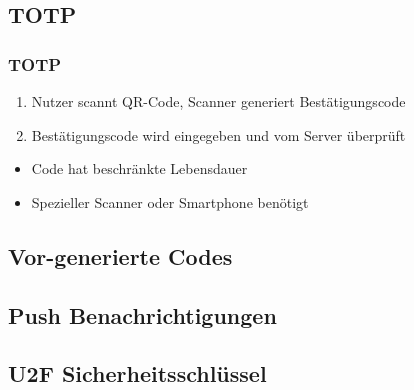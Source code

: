 \subsection{TOTP}
\begin{frame}
    \frametitle{TOTP}
    \begin{enumerate}
        \item Nutzer scannt QR-Code, Scanner generiert Bestätigungscode
        \item Bestätigungscode wird eingegeben und vom Server überprüft
    \end{enumerate}
    \begin{itemize}
        \item Code hat beschränkte Lebensdauer
        \item Spezieller Scanner oder Smartphone benötigt
    \end{itemize}
\end{frame}

\subsection{Vor-generierte Codes}

\subsection{Push Benachrichtigungen}

\subsection{U2F Sicherheitsschlüssel}
